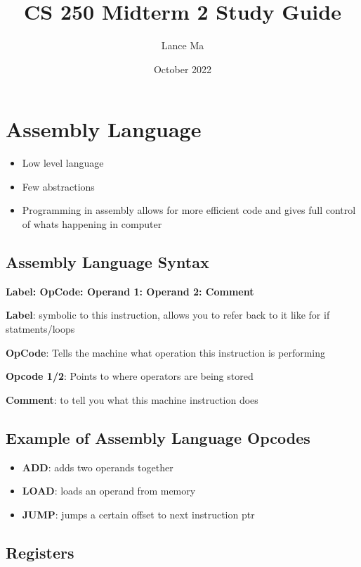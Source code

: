 \documentclass{article}
\title{CS 250 Midterm 2 Study Guide}
\author{Lance Ma}
\date{October 2022}
\begin{document}
\maketitle

\section{Assembly Language}

\begin{itemize}
    \item Low level language
    
    \item Few abstractions
    
    \item Programming in assembly allows for more efficient code and gives full control of whats happening in computer
    

\end{itemize}


\subsection{Assembly Language Syntax}

\textbf{Label: OpCode: Operand 1: Operand 2: Comment}

\textbf{Label}: symbolic to this instruction, allows you to refer back to it like for if statments/loops

\textbf{OpCode}: Tells the machine what operation this instruction is performing

\textbf{Opcode 1/2}: Points to where operators are being stored 

\textbf{Comment}: to tell you what this machine instruction does

\subsection{Example of Assembly Language Opcodes} 
\begin{itemize}
    \item \textbf{ADD}: adds two operands together
    \item \textbf{LOAD}: loads an operand from memory
    \item \textbf{JUMP}: jumps a certain offset to next instruction ptr
    \end{itemize}

\subsection{Registers}
\end{document}
